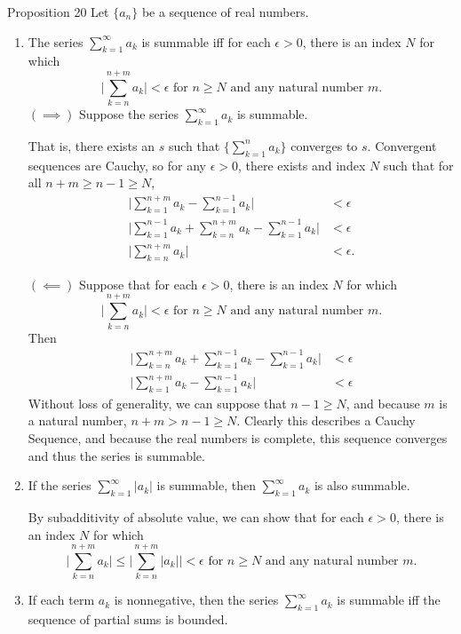 \begin{flushleft}
\begin{namedthm*}{Proposition 20}
	Let $\{a_n \}$ be a sequence of real numbers.
	\begin{enumerate}[label=(\roman*),align=left]
		\item The series $\textstyle \sum_{k=1}^\infty a_k$ is summable iff for each $\epsilon >0$, there is an index $N$ for which
		\[
			\biggl | \sum_{k=n}^{n+m} a_k \biggr | < \epsilon \text{ for } n \ge N \text{ and any natural number } m.	
		\]
		$(\implies)$ Suppose the series $\textstyle \sum_{k=1}^\infty a_k$ is summable.\par
		That is, there exists an $s$ such that $\{\textstyle \sum_{k=1}^n a_k\}$ converges to $s$.
		Convergent sequences are Cauchy, so for any $\epsilon>0$, there exists and index $N$ such that for all $n+m\ge n-1\ge N$,
		\begin{align*}
			\biggl| \sum_{k=1}^{n+m} a_k - \sum_{k=1}^{n-1} a_k\biggr| &< \epsilon\\
			\biggl|\sum_{k=1}^{n-1} a_k + \sum_{k=n}^{n+m} a_k - \sum_{k=1}^{n-1} a_k\biggr| &< \epsilon\\
			\biggl|\sum_{k=n}^{n+m} a_k\biggr| &< \epsilon.
		\end{align*}
		\par
		$(\impliedby)$ Suppose that for each $\epsilon >0$, there is an index $N$ for which
		\[
			\biggl | \sum_{k=n}^{n+m} a_k \biggr | < \epsilon \text{ for } n \ge N \text{ and any natural number } m.	
		\]
		Then
		\begin{align*}
			\biggl | \sum_{k=n}^{n+m} a_k +\sum_{k=1}^{n-1} a_k - \sum_{k=1}^{n-1} a_k \biggr | &< \epsilon\\
			\biggl | \sum_{k=1}^{n+m} a_k - \sum_{k=1}^{n-1} a_k\biggr | &< \epsilon
		\end{align*}
		Without loss of generality, we can suppose that $n-1 \ge N$, and because $m$ is a natural number, $n+m>n-1\ge N$.
		Clearly this describes a Cauchy Sequence, and because the real numbers is complete, this sequence converges and thus the series is summable.
		\item If the series $\sum_{k=1}^\infty |a_k|$ is summable, then $\sum_{k=1}^\infty a_k$ is also summable.\par
		By subadditivity of absolute value, we can show that for each $\epsilon >0$, there is an index $N$ for which
		\[
			\biggl | \sum_{k=n}^{n+m} a_k \biggr |\le \biggl | \sum_{k=n}^{n+m} |a_k| \biggr | < \epsilon \text{ for } n \ge N \text{ and any natural number } m.	
		\]
		\item If each term $a_k$ is nonnegative, then the series $\sum_{k=1}^\infty a_k$ is summable iff the sequence of partial sums is bounded.\par

\end{enumerate}
\end{namedthm*}
\end{flushleft}
